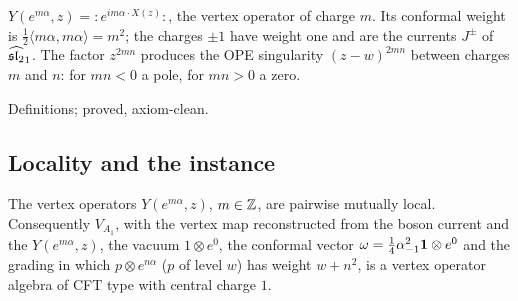 \begin{physics}
$Y(e^{m\alpha},z)={:}e^{im\alpha\cdot X(z)}{:}$, the vertex operator of charge $m$. Its conformal weight is
$\frac12\langle m\alpha,m\alpha\rangle=m^2$; the charges $\pm1$ have weight one and are the currents $J^\pm$ of
$\widehat{\mathfrak{sl}_2}_1$. The factor $z^{2mn}$ produces the OPE singularity $(z-w)^{2mn}$ between charges $m$ and $n$:
for $mn<0$ a pole, for $mn>0$ a zero.
\end{physics}

\begin{status}
Definitions;  proved, axiom-clean.
\end{status}

\subsection{Locality and the instance}

\begin{theorem}[$V_{A_1}$]\label{l05:thm:A1}
The vertex operators $Y(e^{m\alpha},z)$, $m\in{\mathbb{Z}}$, are pairwise mutually local. Consequently $V_{A_1}$, with the
vertex map reconstructed from the boson current and the $Y(e^{m\alpha},z)$, the vacuum $1\otimes e^0$, the conformal
vector $\omega=\frac14\alpha_{-1}^2\mathbf{1}\otimes e^0$ and the grading in which $p\otimes e^{n\alpha}$ ($p$ of level $w$)
has weight $w+n^2$, is a vertex operator algebra of CFT type with central charge $1$.
\end{theorem}

